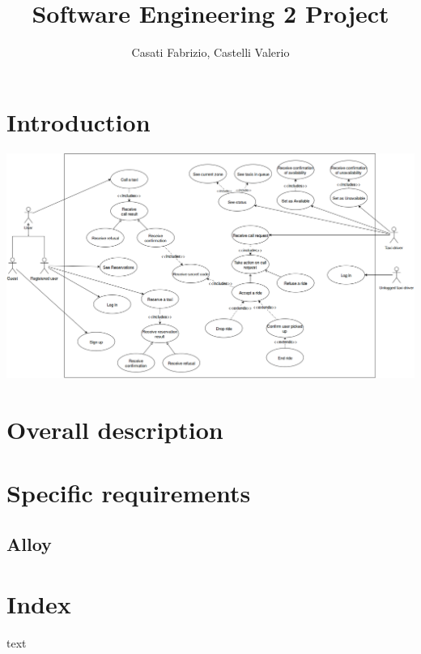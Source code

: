 

\usepackage{graphicx}

\usepackage{graphicx}
\usepackage{wrapfig}
\usepackage{lscape}
\usepackage{rotating}
\usepackage{epstopdf}
\usepackage{lscape}
\usepackage{pdflscape}
\usepackage{pdfpages}
\usepackage[titletoc]{appendix}%




\title{Software Engineering 2 Project}
\author{Casati Fabrizio, Castelli Valerio}

\maketitle
\tableofcontents

\chapter{Introduction}
\begin{landscape}
    \includegraphics[width=580pt, keepaspectratio]{files/index.png}
    \label{fig:PropProf}
\end{landscape}





\chapter{Overall description}


\chapter{Specific requirements}


\begin{appendices}


\chapter{Alloy}

\end{appendices}
\chapter*{Index}
text

